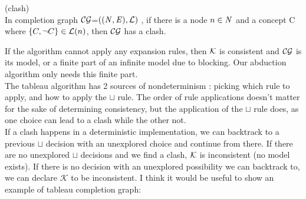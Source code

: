 	\begin{mydef} (clash)\\
		In completion graph $\mathcal{CG}$=$( (\mathit{N}, \mathit{E}),\mathcal{L})$ , if there is a node $n \in \mathit{N}$ and a concept C where $\{ C , \neg C \} \in \mathcal{L} (n)$, then $\mathcal{CG}$ has a clash.
	
\end{mydef}
If the algorithm cannot apply any expansion rules, then $\mathcal{K}$ is consistent and $\mathcal{CG}$ is its model, or a finite part of an infinite model due to blocking. Our abduction algorithm only needs this finite part.\\
 The tableau algorithm has 2 sources of nondeterminism : picking which rule to apply, and how to apply the $\sqcup$ rule. The order of rule applications doesn't matter for the sake of determining consistency, but the application of the $\sqcup$ rule does, as one choice can lead to a clash while the other not. \\ 
If a clash happens in a deterministic implementation, we can backtrack to a previous $\sqcup$ decision with an unexplored choice and continue from there. If there are no unexplored $\sqcup$ decisions and we find a clash, $\mathcal{K}$ is inconsistent (no model exists).     
If there is no decision with an unexplored possibility we can backtrack to, we can declare $\mathcal{K}$ to be inconsistent. 
I think it would be useful to show an example of tableau completion graph:
\\
